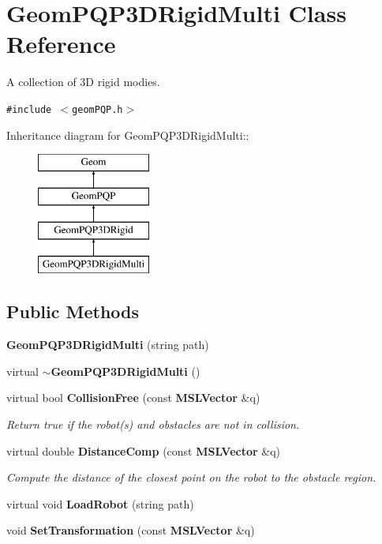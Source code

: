 \section{Geom\-PQP3DRigid\-Multi  Class Reference}
\label{classGeomPQP3DRigidMulti}
A collection of 3D rigid modies. 


{\tt \#include $<$geom\-PQP.h$>$}

Inheritance diagram for Geom\-PQP3DRigid\-Multi::\begin{figure}[H]
\begin{center}
\leavevmode
\includegraphics[height=4cm]{classGeomPQP3DRigidMulti}
\end{center}
\end{figure}
\subsection*{Public Methods}
\begin{CompactItemize}
\item 
{\bf Geom\-PQP3DRigid\-Multi} (string path)
\item 
virtual {\bf $\sim$Geom\-PQP3DRigid\-Multi} ()
\item 
virtual bool {\bf Collision\-Free} (const {\bf MSLVector} \&q)
\begin{CompactList}\small\item\em Return true if the robot(s) and obstacles are not in collision.\item\end{CompactList}\item 
virtual double {\bf Distance\-Comp} (const {\bf MSLVector} \&q)
\begin{CompactList}\small\item\em Compute the distance of the closest point on the robot to the obstacle region.\item\end{CompactList}\item 
virtual void {\bf Load\-Robot} (string path)
\item 
void {\bf Set\-Transformation} (const {\bf MSLVector} \&q)
\end{CompactItemize}

